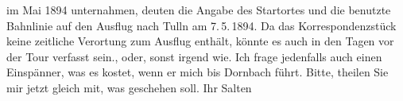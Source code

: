 \begin{ledgroupsized}[t]{13cm}
{{{                  im Mai 1894 unternahmen, deuten die Angabe des Startortes und die
                  benutzte Bahnlinie auf den Ausflug nach Tulln am 7. 5. 1894. Da das Korrespondenzstück keine zeitliche Verortung zum
                  Ausflug enthält, könnte es auch in den Tagen vor der Tour verfasst sein.}}}\label{K_L03133-1h},
               oder, sonst irgend wie. Ich frage jedenfalls auch einen Einspänner, was es kostet,
               wenn er mich bis Dornbach führt. \pend
           \pstart
           Bitte, theilen Sie mir jetzt gleich mit, was geschehen soll. \pend
           \pstart Ihr \spacefill\mbox{Salten}\pend{}
         
         \endnumbering{}\end{ledgroupsized}\begin{anhang}\end{anhang}\newcommand{\dateiname}{L03133}\newcommand{\titel}{Felix Salten an Arthur Schnitzler, [7.? 5. 1894]}\newcommand{\editorInnen}{Martin Anton Müller und Laura Untner}
      